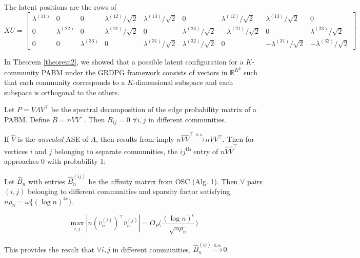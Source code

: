 \documentclass[
  11pt,
]{article}
\begin{document}
\begin{example}[$K = 3$]
The latent positions are the rows of  
$$XU = \begin{bmatrix}
  \lambda^{(11)} & 0 & 0 & 
  \lambda^{(12)} / \sqrt{2} & \lambda^{(13)} / \sqrt{2} & 0 & 
  \lambda^{(12)} / \sqrt{2} & \lambda^{(13)} / \sqrt{2} & 0 \\
  0 & \lambda^{(22)} & 0 & 
  \lambda^{(21)} / \sqrt{2} & 0 & \lambda^{(23)} / \sqrt{2} & 
  -\lambda^{(21)} / \sqrt{2} & 0 & \lambda^{(23)} / \sqrt{2} \\
  0 & 0 & \lambda^{(33)} & 
  0 & \lambda^{(31)} / \sqrt{2} & \lambda^{(32)} / \sqrt{2} & 
  0 & -\lambda^{(31)} / \sqrt{2} & -\lambda^{(32)} / \sqrt{2}
\end{bmatrix}$$
\end{example}

In Theorem \ref{theorem2}, we showed that a possible latent
configuration for a \(K\)-community PABM under the GRDPG framework
consists of vectors in \(\mathbb{R}^{K^2}\) such that each community
corresponds to a \(K\)-dimensional subspace and each subspace is
orthogonal to the others.

\begin{theorem}
\label{osc}
Let $P = V \Lambda V^\top$ be the spectral decomposition of the edge probability matrix of a PABM. Define $B = n V V^\top$. Then $B_{ij} = 0$ $\forall i, j$ in different communities. 
\end{theorem}

If \(\hat{V}\) is the \emph{unscaled} ASE of \(A\), then results from
\citet{rubindelanchy2017statistical} imply
\(n \hat{V} \hat{V}^\top \stackrel{a.s.}{\to} n V V^\top\). Then for
vertices \(i\) and \(j\) belonging to separate communities, the
\(ij\)\textsuperscript{th} entry of \(n \hat{V} \hat{V}^\top\)
approaches 0 with probability 1:

\begin{theorem}
\label{theorem4} 
Let $\hat{B}_n$ with entries $\hat{B}_n^{(ij)}$ be the affinity matrix from OSC 
(Alg. 1). Then $\forall$ pairs $(i, j)$ belonging to different communities 
and sparsity factor satisfying $n \rho_n = \omega\{(\log n)^{4c}\}$, 

\begin{equation} \label{eq:thm4}
\max_{i, j} |n (\hat{v}_n^{(i)})^\top \hat{v}_n^{(j)}| = 
O_P \Big( \frac{(\log n)^c}{\sqrt{n \rho_n}} \Big)
\end{equation}

This provides the result that $\forall i, j$ in different communities, 
$\hat{B}_n^{(ij)} \stackrel{a.s.}{\to} 0$.
\end{theorem}
\end{document}
